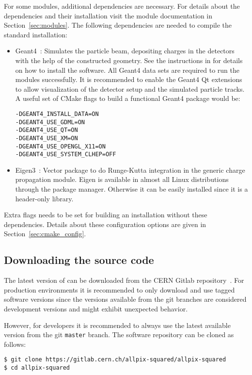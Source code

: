 For some modules, additional dependencies are necessary.
For details about the dependencies and their installation visit the module documentation in Section~\ref{sec:modules}.
The following dependencies are needed to compile the standard installation:
\begin{itemize}
\item Geant4~\cite{geant4}: Simulates the particle beam, depositing charges in the detectors with the help of the constructed geometry.
See the instructions in \cite{geant4installation} for details on how to install the software.
All Geant4 data sets are required to run the modules successfully.
It is recommended to enable the Geant4 Qt extensions to allow visualization of the detector setup and the simulated particle tracks.
A useful set of CMake flags to build a functional Geant4 package would be:
\begin{verbatim}
-DGEANT4_INSTALL_DATA=ON
-DGEANT4_USE_GDML=ON
-DGEANT4_USE_QT=ON
-DGEANT4_USE_XM=ON
-DGEANT4_USE_OPENGL_X11=ON
-DGEANT4_USE_SYSTEM_CLHEP=OFF
\end{verbatim}
\item Eigen3~\cite{eigen3}: Vector package to do Runge-Kutta integration in the generic charge propagation module.
Eigen is available in almost all Linux distributions through the package manager.
Otherwise it can be easily installed since it is a header-only library.
\end{itemize}
Extra flags needs to be set for building an \apsq installation without these dependencies.
Details about these configuration options are given in Section~\ref{sec:cmake_config}.

\subsection{Downloading the source code}
The latest version of \apsq can be downloaded from the CERN Gitlab repository~\cite{ap2-repo}.
For production environments it is recommended to only download and use tagged software versions since the versions available from the git branches are considered development versions and might exhibit unexpected behavior.

However, for developers it is recommended to always use the latest available version from the git \texttt{master} branch.
The software repository can be cloned as follows:

\begin{verbatim}
$ git clone https://gitlab.cern.ch/allpix-squared/allpix-squared
$ cd allpix-squared
\end{verbatim}

